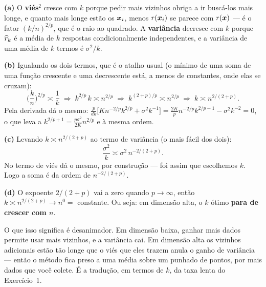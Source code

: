 \documentclass[11pt,a4paper]{article}
\begin{document}
\begin{solucao}
\textbf{(a)} O \textbf{viés$^2$} cresce com $k$ porque pedir mais vizinhos obriga
a ir buscá-los mais longe, e quanto mais longe estão os $\bm{x}_i$, menos $r(\bm{x}_i)$
se parece com $r(\bm{x})$ --- é o fator $(k/n)^{2/p}$, que é o raio ao quadrado. A
\textbf{variância} decresce com $k$ porque $\widehat{r}_k$ é a média de $k$ respostas
condicionalmente independentes, e a variância de uma média de $k$ termos é
$\sigma^2/k$.

\smallskip
\textbf{(b)} Igualando os dois termos, que é o atalho usual (o mínimo de uma soma
de uma função crescente e uma decrescente está, a menos de constantes, onde elas
se cruzam):
\[
  \Big(\frac{k}{n}\Big)^{2/p} \asymp \frac1k
  \;\Longrightarrow\;
  k^{2/p}\,k \asymp n^{2/p}
  \;\Longrightarrow\;
  k^{(2+p)/p} \asymp n^{2/p}
  \;\Longrightarrow\;
  k \asymp n^{2/(2+p)} .
\]
Pela derivada dá o mesmo: $\frac{p}{dk}\big[Kn^{-2/p}k^{2/p}+\sigma^2k^{-1}\big]
= \frac{2K}{p}n^{-2/p}k^{2/p-1}-\sigma^2k^{-2}=0$, o que leva a
$k^{2/p+1}=\frac{p\sigma^2}{2K}n^{2/p}$ e à mesma ordem.

\smallskip
\textbf{(c)} Levando $k\asymp n^{2/(2+p)}$ ao termo de variância (o mais fácil
dos dois):
\[
  \frac{\sigma^2}{k} \asymp \sigma^2\,n^{-2/(2+p)} .
\]
No termo de viés dá o mesmo, por construção --- foi assim que escolhemos $k$.
Logo a soma é da ordem de $n^{-2/(2+p)}$.

\smallskip
\textbf{(d)} O expoente $2/(2+p)$ vai a zero quando $p\to\infty$, então
$k\asymp n^{2/(2+p)}\to n^0=$ constante. Ou seja: em dimensão alta, o $k$ ótimo
\textbf{para de crescer com $n$}.

O que isso significa é desanimador. Em dimensão baixa, ganhar mais dados permite
usar mais vizinhos, e a variância cai. Em dimensão alta os vizinhos adicionais
estão tão longe que o viés que eles trazem anula o ganho de variância --- então o
método fica preso a uma média sobre um punhado de pontos, por mais dados que
você colete. É a tradução, em termos de $k$, da taxa lenta do Exercício~1.
\end{solucao}
\end{document}
